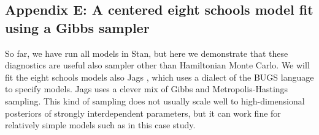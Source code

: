 \documentclass[american,]{article}
\let\oldparagraph\paragraph
\renewcommand{\paragraph}[1]{\oldparagraph{#1}\mbox{}}
\theoremstyle{definition}
\begin{document}



\hypertarget{eight-schools-with-jags}{%
\subsection*{Appendix E: A centered eight schools model fit using a Gibbs sampler}\label{eight-schools-with-jags}}

So far, we have run all models in Stan, but here we demonstrate that
these diagnostics are useful also sampler other than 
Hamiltonian Monte Carlo.  We will fit the eight schools models also
 Jags \citep{plummer2003jags}, which uses a dialect of the BUGS
language \citep{lunn2009bugs} to specify models. Jags uses a clever
mix of Gibbs and Metropolis-Hastings sampling. This kind of sampling
does not usually scale well to high-dimensional posteriors of strongly
interdependent parameters, but it can work fine for relatively simple models such as in this case study.


\end{document}

